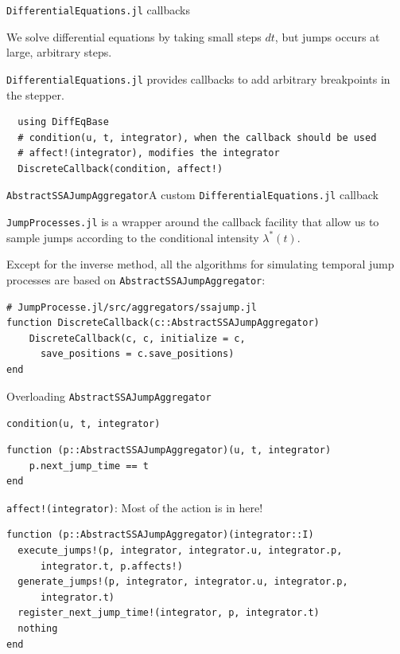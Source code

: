 \documentclass[
  ignorenonframetext,
  aspectratio=169,
  xcolor={dvipsnames,rgb}
]{beamer}
\begin{document}
\begin{frame}[fragile=singleslide]{\texttt{DifferentialEquations.jl} callbacks}

We solve differential equations by taking small steps \( dt \), but jumps occurs at large, arbitrary steps.

\texttt{DifferentialEquations.jl} provides callbacks to add arbitrary breakpoints in the stepper.

\begin{lstlisting}
  using DiffEqBase
  # condition(u, t, integrator), when the callback should be used
  # affect!(integrator), modifies the integrator
  DiscreteCallback(condition, affect!)
\end{lstlisting}

\end{frame}

\begin{frame}[fragile=singleslide]{\texttt{AbstractSSAJumpAggregator}}{A custom \texttt{DifferentialEquations.jl} callback}

\texttt{JumpProcesses.jl} is a wrapper around the callback facility that allow us to sample jumps according to the conditional intensity \( \lambda^\ast (t) \).

Except for the inverse method, all the algorithms for simulating temporal jump processes are based on \texttt{AbstractSSAJumpAggregator}:

\begin{lstlisting}
# JumpProcesse.jl/src/aggregators/ssajump.jl
function DiscreteCallback(c::AbstractSSAJumpAggregator)
    DiscreteCallback(c, c, initialize = c,
      save_positions = c.save_positions)
end
\end{lstlisting}

\end{frame}

\begin{frame}[fragile=singleslide]{Overloading \texttt{AbstractSSAJumpAggregator}}

\texttt{condition(u, t, integrator)}

\begin{lstlisting}
function (p::AbstractSSAJumpAggregator)(u, t, integrator)
    p.next_jump_time == t
end
\end{lstlisting}

\texttt{affect!(integrator)}: Most of the action is in here!

\begin{lstlisting}
function (p::AbstractSSAJumpAggregator)(integrator::I)
  execute_jumps!(p, integrator, integrator.u, integrator.p,
      integrator.t, p.affects!)
  generate_jumps!(p, integrator, integrator.u, integrator.p,
      integrator.t)
  register_next_jump_time!(integrator, p, integrator.t) 
  nothing
end
\end{lstlisting}

\end{frame}
\end{document}
